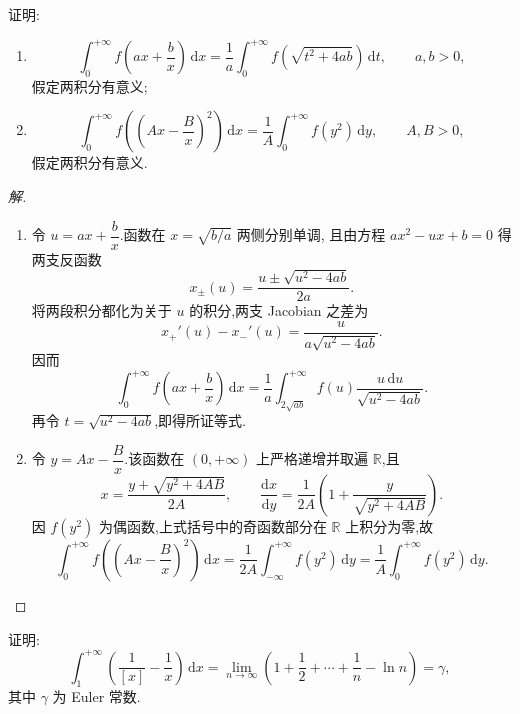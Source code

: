 \documentclass[../../数学分析培优讲义(答案版).tex]{subfiles}
\begin{document}
\begin{example}
证明:
\begin{enumerate}[label=(\arabic*)]
    \item
    \[
        \int_0^{+\infty}f\left(ax+\dfrac{b}{x}\right)\,\mathrm{d}x
        =\dfrac{1}{a}\int_0^{+\infty}f\left(\sqrt{t^2+4ab}\right)\,\mathrm{d}t,
        \qquad a,b>0,
    \]
    假定两积分有意义;
    \item
    \[
        \int_0^{+\infty}f\left(\left(Ax-\dfrac{B}{x}\right)^2\right)\,\mathrm{d}x
        =\dfrac{1}{A}\int_0^{+\infty}f(y^2)\,\mathrm{d}y,
        \qquad A,B>0,
    \]
    假定两积分有意义.
\end{enumerate}
\end{example}

\begin{proof}[解]
\begin{enumerate}[label=(\arabic*)]
    \item 令 $u=ax+\dfrac{b}{x}$.函数在 $x=\sqrt{b/a}$ 两侧分别单调,
    且由方程 $ax^2-ux+b=0$ 得两支反函数
    \[
        x_\pm(u)=\dfrac{u\pm\sqrt{u^2-4ab}}{2a}.
    \]
    将两段积分都化为关于 $u$ 的积分,两支 Jacobian 之差为
    \[
        x_+'(u)-x_-'(u)=\dfrac{u}{a\sqrt{u^2-4ab}}.
    \]
    因而
    \[
        \int_0^{+\infty}f\left(ax+\dfrac{b}{x}\right)\,\mathrm{d}x
        =\dfrac{1}{a}\int_{2\sqrt{ab}}^{+\infty}
        f(u)\dfrac{u\,\mathrm{d}u}{\sqrt{u^2-4ab}}.
    \]
    再令 $t=\sqrt{u^2-4ab}$,即得所证等式.

    \item 令 $y=Ax-\dfrac{B}{x}$.该函数在 $(0,+\infty)$ 上严格递增并取遍
    $\mathbb{R}$,且
    \[
        x=\dfrac{y+\sqrt{y^2+4AB}}{2A},
        \qquad
        \dfrac{\mathrm{d}x}{\mathrm{d}y}
        =\dfrac{1}{2A}\left(1+\dfrac{y}{\sqrt{y^2+4AB}}\right).
    \]
    因 $f(y^2)$ 为偶函数,上式括号中的奇函数部分在 $\mathbb{R}$ 上积分为零,故
    \[
        \int_0^{+\infty}f\left(\left(Ax-\dfrac{B}{x}\right)^2\right)\,\mathrm{d}x
        =\dfrac{1}{2A}\int_{-\infty}^{+\infty}f(y^2)\,\mathrm{d}y
        =\dfrac{1}{A}\int_0^{+\infty}f(y^2)\,\mathrm{d}y.
    \]
\end{enumerate}
\end{proof}

\begin{example}[\markstar]
证明:
\[
    \int_1^{+\infty}\left(\dfrac{1}{[x]}-\dfrac{1}{x}\right)\,\mathrm{d}x
    =\lim\limits_{n\to\infty}\left(1+\dfrac{1}{2}+\cdots+\dfrac{1}{n}-\ln n\right)
    =\gamma,
\]
其中 $\gamma$ 为 Euler 常数.
\end{example}
\end{document}
